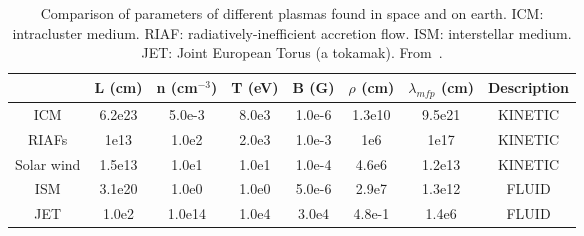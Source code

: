 \begin{table}[h]
  \begin{tabular}{c|c|c|c|c|c|c|c}  
    & L (cm) & n (cm$^{-3}$) & T (eV) & B (G) & $\rho$ (cm) & $\lambda_{mfp}$ (cm) & Description \\ \hline\hline
    ICM & 6.2e23 & 5.0e-3 & 8.0e3 & 1.0e-6 & 1.3e10 & 9.5e21 & KINETIC \\ 
    RIAFs & 1e13 & 1.0e2 & 2.0e3 & 1.0e-3 & 1e6 & 1e17 & KINETIC \\ 
    Solar wind & 1.5e13 & 1.0e1 & 1.0e1 & 1.0e-4 & 4.6e6 & 1.2e13 & KINETIC  \\ \hline
    ISM & 3.1e20 & 1.0e0 & 1.0e0 & 5.0e-6 & 2.9e7 & 1.3e12 & FLUID \\ 
    JET & 1.0e2 & 1.0e14 & 1.0e4 & 3.0e4 & 4.8e-1 & 1.4e6 & FLUID  \\ 
  \end{tabular}
  \caption{Comparison of parameters of different plasmas found in space and on earth. ICM: intracluster medium. RIAF: radiatively-inefficient accretion flow. ISM: interstellar medium. JET: Joint European Torus (a tokamak). From~\cite{Kunz2010,AST521Pset1}.}
  \label{table:paramCompare}
\end{table}

